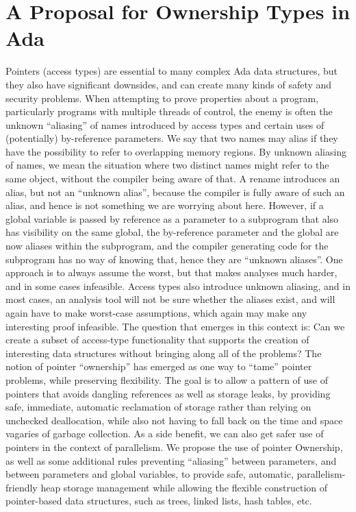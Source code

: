 \documentclass{llncs}
\begin{document}
\section{A Proposal for Ownership Types in Ada}
Pointers (access types) are essential to many complex Ada data structures, but they also have significant downsides, and can create many kinds of safety and security problems.
When attempting to prove properties about a program, particularly programs with multiple threads of control, the enemy is often the unknown ``aliasing'' of names introduced by
access types and certain uses of (potentially) by-reference parameters. We say that two names may alias if they have the possibility to refer to overlapping memory regions.
By unknown aliasing of names, we mean the situation where two distinct names might refer to the same object, without the compiler being aware of that.  A rename introduces
an alias, but not an ``unknown alias'', because the compiler is fully aware of such an alias, and hence is not something we are worrying about here. However, if a global
variable is passed by reference as a parameter to a subprogram that also has visibility on the same global, the by-reference parameter and the global are now aliases within
the subprogram, and the compiler generating code for the subprogram has no way of knowing that, hence they are ``unknown aliases''.  One approach is to always assume the worst,
but that makes analyses much harder, and in some cases infeasible. Access types also introduce unknown aliasing, and in most cases, an analysis tool will not be
sure whether the aliases exist, and will again have to make worst-case assumptions, which again may make any interesting proof infeasible.
The question that emerges in this context is: Can we create a subset of access-type functionality that supports the creation of interesting data structures without bringing along
all of the problems? The notion of pointer ``ownership'' has emerged as one way to ``tame'' pointer problems, while preserving flexibility.  The goal is to allow a pattern of use
of pointers that avoids dangling references as well as storage leaks, by providing safe, immediate, automatic reclamation of storage rather than relying on unchecked deallocation,
while also not having to fall back on the time and space vagaries of garbage collection.  As a side benefit, we can also get safer use of pointers in the context of parallelism.
We propose the use of pointer Ownership, as well as some additional rules preventing ``aliasing'' between parameters, and between parameters and global variables, to provide safe,
automatic, parallelism-friendly heap storage management while allowing the flexible construction of pointer-based data structures, such as trees, linked lists, hash tables, etc.
\end{document}
